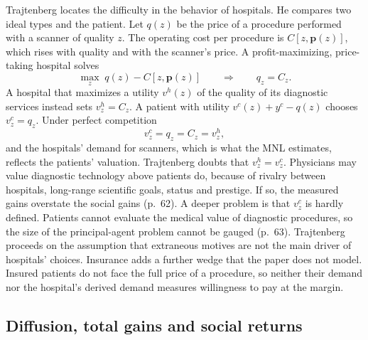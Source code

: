Trajtenberg locates the difficulty in the behavior of hospitals. He compares two ideal types and the patient. Let
$q(z)$ be the price of a procedure performed with a scanner of quality $z$. The operating cost per procedure is
$C[z,\mathbf{p}(z)]$, which rises with quality and with the scanner's price. A profit-maximizing, price-taking hospital solves
\begin{equation*}
\max_z\; q(z) - C[z,\mathbf{p}(z)]
\qquad\Longrightarrow\qquad
q_z = C_z .
\end{equation*}
A hospital that maximizes a utility $v^h(z)$ of the quality of its diagnostic services instead sets $v^h_z = C_z$. A
patient with utility $v^c(z) + y^c - q(z)$ chooses $v^c_z = q_z$. Under perfect competition
\begin{equation}\label{eq:10-traj-agency}
v^c_z = q_z = C_z = v^h_z ,
\end{equation}
and the hospitals' demand for scanners, which is what the MNL estimates, reflects the patients' valuation. Trajtenberg
doubts that $v^h_z = v^c_z$. Physicians may value diagnostic technology above patients do, because of rivalry between
hospitals, long-range scientific goals, status and prestige. If so, the measured gains overstate the social gains
(p.~62). A deeper problem is that $v^c_z$ is hardly defined. Patients cannot evaluate the medical value of diagnostic
procedures, so the size of the principal-agent problem cannot be gauged (p.~63). Trajtenberg proceeds on the
assumption that extraneous motives are not the main driver of hospitals' choices. Insurance adds a further wedge
that the paper does not model. Insured patients do not face the full price of a procedure, so neither their demand nor
the hospital's derived demand measures willingness to pay at the margin.

\subsection{Diffusion, total gains and social returns}\label{sec:10-ct-diffusion}

